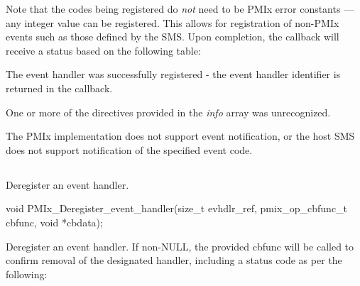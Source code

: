 Note that the codes being registered do \textit{not} need to be \ac{PMIx} error constants --- any integer value can be registered. This allows for registration of non-PMIx events such as those defined by the \ac{SMS}. Upon completion, the callback will receive a status based on the following table:

\begin{constantdesc}
\item {} The event handler was successfully registered - the event handler identifier is returned in the callback.
\item {} One or more of the directives provided in the \textit{info} array was unrecognized.
\item {} The \ac{PMIx} implementation does not support event notification, or the host \ac{SMS} does not support notification of the specified event code.
\end{constantdesc}



\subsection{}

\summary

Deregister an event handler.

\format

\cspecificstart
\begin{codepar}
void
PMIx_Deregister_event_handler(size_t evhdlr_ref,
                              pmix_op_cbfunc_t cbfunc,
                              void *cbdata);
\end{codepar}
\cspecificend

\begin{arglist}
\end{arglist}

\descr

Deregister an event handler. If non-NULL, the provided cbfunc will be called to confirm removal of the designated handler, including a status code as per the following:

